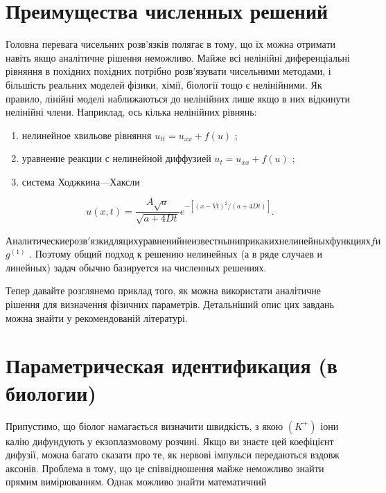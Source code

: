\documentclass[
  ukrainian,
]{article}
\begin{document}
\section{Преимущества численных
решений}\label{ux43fux440ux435ux438ux43cux443ux449ux435ux441ux442ux432ux430-ux447ux438ux441ux43bux435ux43dux43dux44bux445-ux440ux435ux448ux435ux43dux438ux439-1}

Головна перевага чисельних розв'язків полягає в тому, що їх можна
отримати навіть якщо аналітичне рішення неможливо. Майже всі нелінійні
диференціальні рівняння в похідних похідних потрібно розв'язувати
чисельними методами, і більшість реальних моделей фізики, хімії,
біології тощо є нелінійними. Як правило, лінійні моделі наближаються до
нелінійних лише якщо в них відкинути нелінійні члени. Наприклад, ось
кілька нелінійних рівнянь:

\begin{enumerate}
\def\labelenumi{\arabic{enumi})}
\item
  нелинейное хвильове рівняння \(u_{tt} = u_{xx} + f(u)\) ;
\item
  уравнение реакции с нелинейной диффузией \(u_t = u_{xx} + f(u)\) ;
\item
  система Ходжкина---Хаксли
\end{enumerate}

\[
u(x, t) = \frac{A\sqrt{a}}{\sqrt{a+4Dt}}e^{-[(x-Vt)^{2}/(a+4Dt)]}.
\]

\(Аналитические розв'язки для цих уравнений не известны ни при каких нелинейных функциях f и\)
\(g^{(1)}\) . Поэтому общий подход к решению нелинейных (а в ряде
случаев и линейных) задач обычно базируется на численных решениях.

Тепер давайте розглянемо приклад того, як можна використати аналітичне
рішення для визначення фізичних параметрів. Детальніший опис цих завдань
можна знайти у рекомендованій літературі.

\section{Параметрическая идентификация (в
биологии)}\label{ux43fux430ux440ux430ux43cux435ux442ux440ux438ux447ux435ux441ux43aux430ux44f-ux438ux434ux435ux43dux442ux438ux444ux438ux43aux430ux446ux438ux44f-ux432-ux431ux438ux43eux43bux43eux433ux438ux438}

Припустимо, що біолог намагається визначити швидкість, з якою \((K^+)\)
іони калію дифундують у екзоплазмовому розчині. Якщо ви знаєте цей
коефіцієнт дифузії, можна багато сказати про те, як нервові імпульси
передаються вздовж аксонів. Проблема в тому, що це співвідношення майже
неможливо знайти прямим вимірюванням. Однак можливо знайти математичний
\end{document}
